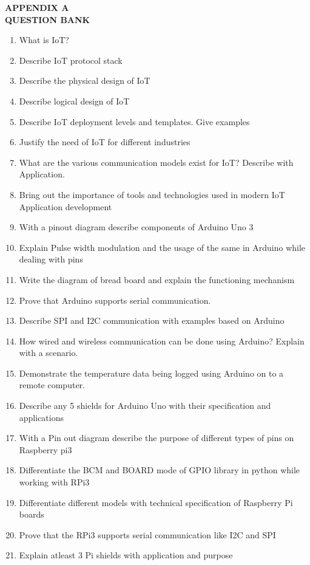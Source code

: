 \documentclass[12pt,a4paper]{article}
\begin{document}
\begin{center}
\large{\textbf{APPENDIX A}\\
\textbf{QUESTION BANK}}
\end{center}
\begin{enumerate}
\item What is IoT?
\item Describe IoT protocol stack
\item Describe the physical design of IoT
\item Describe logical design of IoT
\item Describe IoT deployment levels and templates. Give examples
\item Justify the need of IoT for different industries
\item What are the various communication models exist for IoT? Describe with Application.
\item Bring out the importance of tools and technologies used in modern IoT Application development
\item With a pinout diagram describe components of Arduino Uno 3
\item Explain Pulse width modulation and the usage of the same in Arduino while dealing with pins
\item Write the diagram of bread board and explain the functioning mechanism 
\item Prove that Arduino supports serial communication.
\item Describe SPI and I2C communication with examples based on Arduino
\item How wired and wireless communication can be done using Arduino? Explain with a scenario.
\item Demonstrate the temperature data being logged using Arduino on to a remote computer.
\item Describe any 5 shields for Arduino Uno with their specification and applications 
\item With a Pin out diagram describe the purpose of different types of pins on Raspberry pi3
\item Differentiate the BCM and BOARD  mode of GPIO library in python while working with RPi3
\item Differentiate different models with technical specification of Raspberry Pi boards
\item Prove that the RPi3 supports serial communication like I2C and SPI
\item Explain atleast 3 Pi shields with application and purpose

\end{enumerate}
\end{document}
